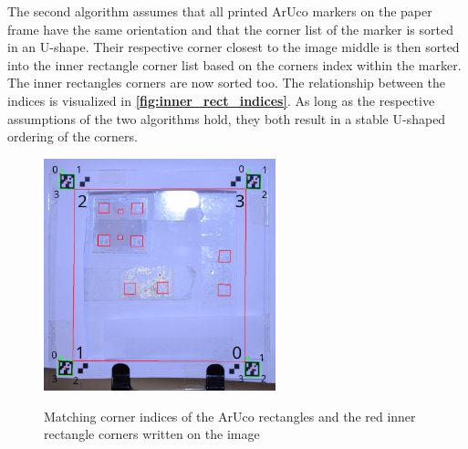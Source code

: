 \documentclass[10pt]{book}
\newenvironment{code}{\captionsetup{type=listing}}{}
\newcommand{\figureref}[1]{\textbf{\autoref{#1}}}
\begin{document}
The second algorithm assumes that all printed \ac{ArUco} markers on the paper frame have the same orientation and that the corner list of the marker is sorted in an U-shape. Their respective corner closest to the image middle is then sorted into the inner rectangle corner list based on the corners index within the marker. %
The inner rectangles corners are now sorted too. The relationship between the indices is visualized in \figureref{fig:inner_rect_indices}. As long as the respective assumptions of the two algorithms hold, they both result in a stable U-shaped ordering of the corners.

\begin{figure}
  \caption{Matching corner indices of the \ac{ArUco} rectangles and the red inner rectangle corners written on the image}
  \includegraphics[width=0.6\textwidth]{image/af_markings_3}
  \label{fig:inner_rect_indices}
\end{figure}


                
        
\end{document}
